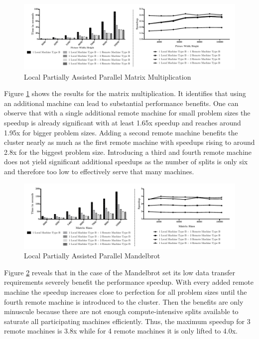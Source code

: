 \begin{figure}[!htb]

	\includegraphics[width=1.0\textwidth]{images/local_partially_assisted_matrix.pdf}
	\centering
	\caption{Local Partially Assisted Parallel Matrix Multiplication}
	\label{img:parallel_matrix}
\end{figure}

Figure \ref{img:parallel_matrix} shows the results for the matrix multiplication. It identifies that using an additional machine can lead to substantial performance benefits. One can observe that with a single additional remote machine for small problem sizes the speedup is already significant with at least 1.65x speedup and reaches around 1.95x for bigger problem sizes. Adding a second remote machine benefits the cluster nearly as much as the first remote machine with speedups rising to around 2.8x for the biggest problem size. Introducing a third and fourth remote machine does not yield significant additional speedups as the number of splits is only six and therefore too low to effectively serve that many machines.

\begin{figure}[!htb]

	\includegraphics[width=1.0\textwidth]{images/local_partially_assisted_mandelbrot.pdf}
	\centering
	\caption{Local Partially Assisted Parallel Mandelbrot}
	\label{img:parallel_mandelbrot}
\end{figure}

Figure \ref{img:parallel_mandelbrot} reveals that in the case of the Mandelbrot set its low data transfer requirements severely benefit the performance speedup. With every added remote machine the speedup increases close to perfection for all problem sizes until the fourth remote machine is introduced to the cluster. Then the benefits are only minuscule because there are not enough compute-intensive splits available to saturate all participating machines efficiently. Thus, the maximum speedup for 3 remote machines is 3.8x while for 4 remote machines it is only lifted to 4.0x.


